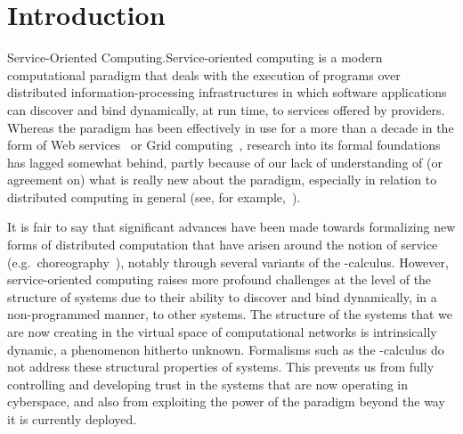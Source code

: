 \documentclass{LMCS}
\begin{document}
\section{Introduction}

\begin{minisection}{Service-Oriented Computing.}Service-oriented computing is a modern computational paradigm that deals with the execution of programs over distributed information-processing infrastructures in which software applications can discover and bind dynamically, at run time, to services offered by providers.
  Whereas the paradigm has been effectively in use for a more than a decade in the form of Web services~\cite{Alonso-Casati-Kuno-Machiraju:Web-Services-2004} or Grid computing~\cite{Foster-Kesselman:The-Grid-2-2004}, research into its formal foundations has lagged somewhat behind, partly because of our lack of understanding of (or agreement on) what is really new about the paradigm, especially in relation to distributed computing in general (see, for example,~\cite{Vogels:Web-services-are-not-distributed-objects-2003}).

  It is fair to say that significant advances have been made towards formalizing new forms of distributed computation that have arisen around the notion of service (e.g.\ choreography~\cite{Su-Bultan-Fu-Zhao:Web-service-choreographies-2007}), notably through several variants of the \nb-calculus.  However, service-oriented computing raises more profound challenges at the level of the structure of  systems due to their ability to discover and bind dynamically, in a non-programmed manner, to other systems.  The structure of the systems that we are now creating in the virtual space of computational networks is intrinsically dynamic, a phenomenon hitherto unknown. Formalisms such as  the \nb-calculus do not address these structural properties of systems.
  This prevents us from fully controlling and developing trust in the systems that are now operating in cyberspace, and also from exploiting the power of the paradigm beyond the way it is currently deployed.


\end{minisection}
\end{document}
